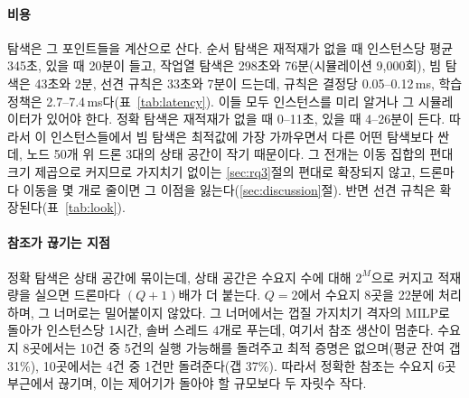 \documentclass[final,5p,times,twocolumn]{elsarticle}
\begin{document}
\paragraph{비용}
탐색은 그 포인트들을 계산으로 산다. 순서 탐색은 재적재가 없을 때 인스턴스당 평균 345초, 있을 때
20분이 들고, 작업열 탐색은 298초와 76분(시뮬레이션 9{,}000회), 빔 탐색은 43초와 2분, 선견 규칙은
33초와 7분이 드는데, 규칙은 결정당 0.05--0.12\,ms, 학습 정책은 2.7--7.4\,ms다(표~\ref{tab:latency}).
이들 모두 인스턴스를 미리 알거나 그 시뮬레이터가 있어야 한다. 정확 탐색은 재적재가 없을 때 0--11초,
있을 때 4--26분이 든다. 따라서 이 인스턴스들에서 빔 탐색은 최적값에 가장 가까우면서 다른 어떤
탐색보다 싼데, 노드 50개 위 드론 3대의 상태 공간이 작기 때문이다. 그 전개는 이동 집합의 편대 크기
제곱으로 커지므로 가지치기 없이는 \ref{sec:rq3}절의 편대로 확장되지 않고, 드론마다 이동을 몇 개로
줄이면 그 이점을 잃는다(\ref{sec:discussion}절). 반면 선견 규칙은 확장된다(표~\ref{tab:look}).

\paragraph{참조가 끊기는 지점}
정확 탐색은 상태 공간에 묶이는데, 상태 공간은 수요지 수에 대해 $2^M$으로 커지고 적재량을 실으면
드론마다 $(Q+1)$배가 더 붙는다. $Q = 2$에서 수요지 8곳을 22분에 처리하며, 그 너머로는 밀어붙이지
않았다. 그 너머에서는 껍질 가지치기 격자의 MILP로 돌아가 인스턴스당 1시간, 솔버 스레드 4개로
푸는데, 여기서 참조 생산이 멈춘다. 수요지 8곳에서는 10건 중 5건의 실행 가능해를 돌려주고 최적
증명은 없으며(평균 잔여 갭 31\%), 10곳에서는 4건 중 1건만 돌려준다(갭 37\%). 따라서 정확한
참조는 수요지 6곳 부근에서 끊기며, 이는 제어기가 돌아야 할 규모보다 두 자릿수 작다.

\begin{table}[t]
\centering
\caption{$h = 98$\,m 시공간 모형의 최적값 대 여덟 방법, 드론 3대. 모든 방법을 모형의 결정
공간에서 돌렸고, 그 공간에서 최적값은 유효한 하한이다. $Q = 2$인 행은 재적재를 적어도 한 번
강제한다. 각 칸은 그 방법이 완주한 인스턴스에 대한 평균 격차이고, 괄호 안은 증명된 최적값을 돌려준
인스턴스 수이며, 전부 완주하지 못한 곳에는 완주 수를 위첨자로 적었다. 마지막 행은 모든 방법이
완주한 인스턴스에 대한 평균이다. 학습 값은 30회 실행의 중앙값, 미세조정 열은 그 중앙값들의 시드 둘에
대한 중앙값이며, 순서 탐색은 시뮬레이션 1{,}200회, 작업열 탐색은 2{,}400회($M \le 6$) 또는
9{,}000회($Q = 2$), 빔 탐색은 $B = 30{,}000$을 쓴다.}
\label{tab:exact}
\scriptsize
\setlength{\tabcolsep}{1.4pt}

\end{table}
\end{document}
